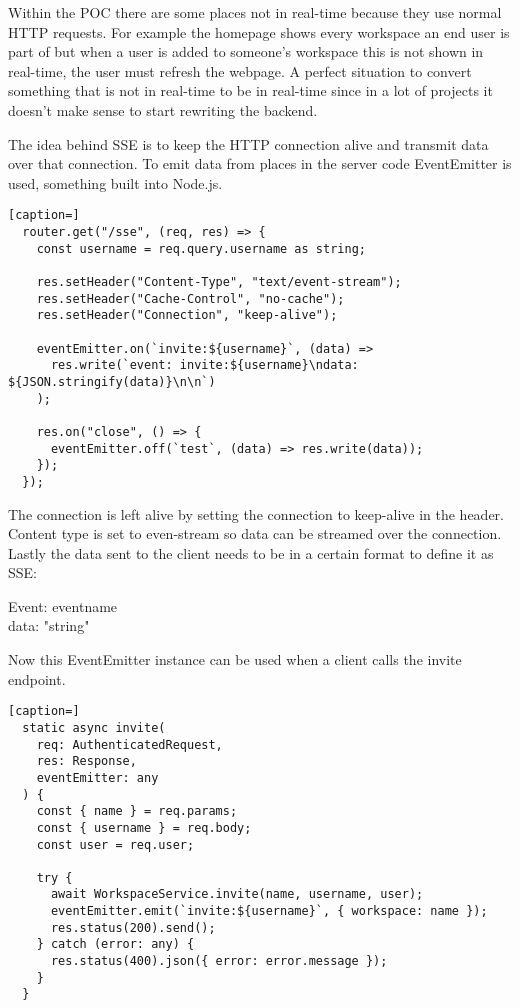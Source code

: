 Within the POC there are some places not in real-time because they use normal HTTP requests. For example the homepage shows every workspace an end user is part of but when a user is added to someone's workspace this is not shown in real-time, the user must refresh the webpage. A perfect situation to convert something that is not in real-time to be in real-time since in a lot of projects it doesn't make sense to start rewriting the backend.

The idea behind SSE is to keep the HTTP connection alive and transmit data over that connection. To emit data from places in the server code EventEmitter is used, something built into Node.js.

\begin{lstlisting}[caption=]
  router.get("/sse", (req, res) => {
    const username = req.query.username as string;
   
    res.setHeader("Content-Type", "text/event-stream");
    res.setHeader("Cache-Control", "no-cache");
    res.setHeader("Connection", "keep-alive");
   
    eventEmitter.on(`invite:${username}`, (data) =>
      res.write(`event: invite:${username}\ndata: ${JSON.stringify(data)}\n\n`)
    );
   
    res.on("close", () => {
      eventEmitter.off(`test`, (data) => res.write(data));
    });
  });
\end{lstlisting}

The connection is left alive by setting the connection to keep-alive in the header. Content type is set to even-stream so data can be streamed over the connection. Lastly the data sent to the client needs to be in a certain format to define it as SSE:

Event: eventname\\
data: "string"

Now this EventEmitter instance can be used when a client calls the invite endpoint.

\begin{lstlisting}[caption=]
  static async invite(
    req: AuthenticatedRequest,
    res: Response,
    eventEmitter: any
  ) {
    const { name } = req.params;
    const { username } = req.body;
    const user = req.user;
 
    try {
      await WorkspaceService.invite(name, username, user);
      eventEmitter.emit(`invite:${username}`, { workspace: name });
      res.status(200).send();
    } catch (error: any) {
      res.status(400).json({ error: error.message });
    }
  }
\end{lstlisting}

